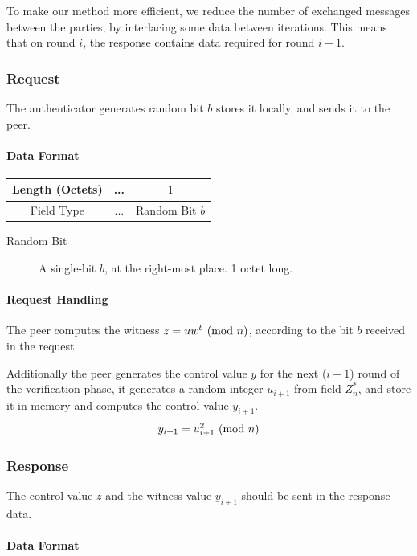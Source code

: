 To make our method more efficient, we reduce the number of exchanged messages between the parties,
by interlacing some data between iterations.
This means that on round $i$, the response contains data required for round $i+1$.

\subsubsection{Request}
The authenticator generates random bit $b$ stores it locally, and sends it to the peer.
\paragraph{Data Format}

\begin{center}
\begin{tabular}{|c|c|c|}
	\hline
	Length (Octets) & ... & $1$ \\
	\hline
	Field Type & ... & Random Bit $b$\\
	\hline
\end{tabular}
\end{center}

\begin{description}
	\item[Random Bit] A single-bit $b$, at the right-most place. 1 octet long.
\end{description}

\paragraph{Request Handling}
The peer computes the witness $z = uw^b \ (\mathrm{mod}\ n)$, according to the bit $b$ received in the request.

Additionally the peer generates the control value $y$ for the next ($i+1$) round of the verification phase, it generates a random integer $u_{i+1}$ from field $Z^*_n$, and store it in memory and computes the control value $y_{i+1}$.
$$y_{i+1} = u_{i+1}^2 \ (\mathrm{mod}\ n)$$

\subsubsection{Response}

The control value $z$ and the witness value $y_{i+1}$ should be sent in the response data.
\paragraph{Data Format}

